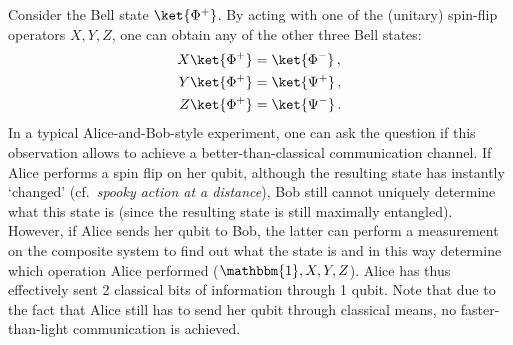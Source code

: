 
    \begin{method}
        Consider the Bell state $\ket{\Phi^+}$. By acting with one of the (unitary) spin-flip operators $X,Y,Z$, one can obtain any of the other three Bell states:
        \begin{gather}
            \begin{aligned}
                X\ket{\Phi^+} &= \ket{\Phi^-}\,,\\
                Y\ket{\Phi^+} &= \ket{\Psi^+}\,,\\
                Z\ket{\Phi^+} &= \ket{\Psi^-}\,.
            \end{aligned}
        \end{gather}
        In a typical Alice-and-Bob-style experiment, one can ask the question if this observation allows to achieve a better-than-classical communication channel. If Alice performs a spin flip on her qubit, although the resulting state has instantly `changed' (cf.~\textit{spooky action at a distance}), Bob still cannot uniquely determine what this state is (since the resulting state is still maximally entangled). However, if Alice sends her qubit to Bob, the latter can perform a measurement on the composite system to find out what the state is and in this way determine which operation Alice performed ($\mathbbm{1},X,Y,Z$). Alice has thus effectively sent 2 classical bits of information through 1 qubit. Note that due to the fact that Alice still has to send her qubit through classical means, no faster-than-light communication is achieved.
    \end{method}

